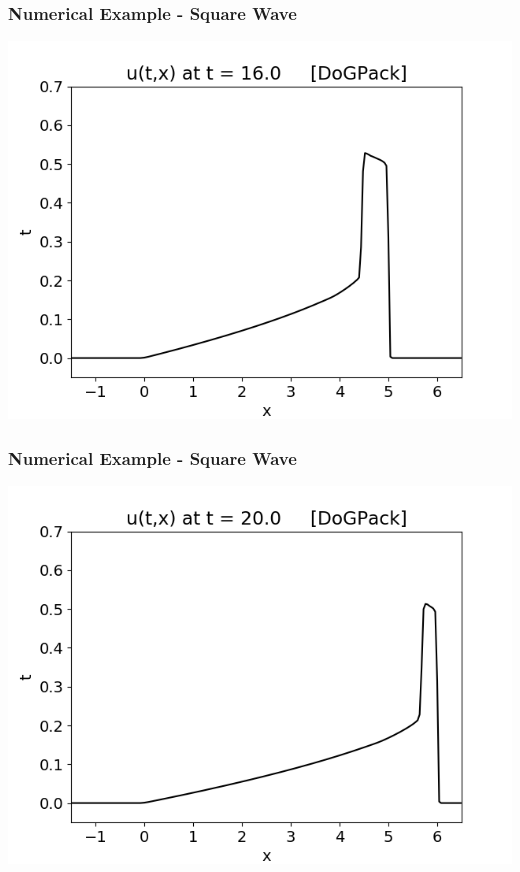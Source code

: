 \documentclass[10pt]{beamer}
\begin{document}
    \begin{frame}
      \frametitle{Numerical Example - Square Wave}
      \begin{center}
        \includegraphics[scale=0.6]{Figures/squarewave16.png}
      \end{center}
    \end{frame}
    \begin{frame}
      \frametitle{Numerical Example - Square Wave}
      \begin{center}
        \includegraphics[scale=0.6]{Figures/squarewave20.png}
      \end{center}
    \end{frame}
\end{document}

